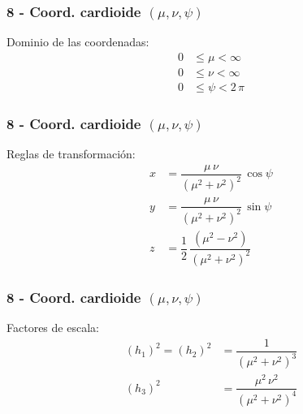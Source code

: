 \documentclass[12pt]{beamer}
\begin{document}
\begin{frame}
\frametitle{8 - Coord. cardioide $(\mu, \nu, \psi)$}
\fontsize{12}{12}\selectfont
Dominio de las coordenadas:
\pause
\begin{align*}
0 &\leq \mu < \infty \\
0 &\leq \nu < \infty \\
0 &\leq \psi < 2 \, \pi
\end{align*}
\end{frame}
\begin{frame}
\frametitle{8 - Coord. cardioide $(\mu, \nu, \psi)$}
\fontsize{12}{12}\selectfont
Reglas de transformación:
\pause
\begin{align*}
x &= \dfrac{\mu \, \nu}{(\mu^{2} + \nu^{2})^{2}} \, \cos \psi \\[0.5em]
y &= \dfrac{\mu \, \nu}{(\mu^{2} + \nu^{2})^{2}} \, \sin \psi \\[0.5em]
z &= \dfrac{1}{2} \, \dfrac{(\mu^{2} - \nu^{2})}{(\mu^{2} + \nu^{2})^{2}}
\end{align*}
\end{frame}
\begin{frame}
\frametitle{8 - Coord. cardioide $(\mu, \nu, \psi)$}
\fontsize{12}{12}\selectfont
Factores de escala:
\pause
\begin{align*}
(h_{1})^{2} = (h_{2})^{2} &= \dfrac{1}{(\mu^{2} + \nu^{2})^{3}} \\[0.5em]
(h_{3})^{2} &= \dfrac{\mu^{2} \, \nu^{2}}{(\mu^{2} + \nu^{2})^{4}}
\end{align*}
\end{frame}
\end{document}
